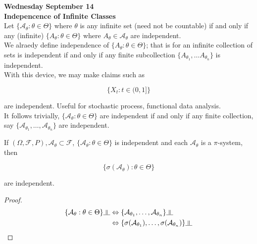\documentclass[11pt,fleqn]{book} %
\newcommand{\indep}{\rotatebox[origin=c]{90}{$\models$}}
\begin{document}
\textbf{Wednesday September 14}\\

\textbf{Indepencence of Infinite Classes}\\

Let $\{\mathcal{A}_\theta: \theta \in \Theta \}$ where $\theta$ is any infinite set (need not be countable) if and only if any (infinite) $\{A_\theta: \theta \in \Theta \}$ where $A_\theta \in \mathcal{A}_\theta$ are independent. \\

We alraedy define independence of $\{A_\theta: \theta \in \Theta \}$; that is for an infinite collection of sets is independent if and only if any finite subcollection $\{ A_{\theta_1}, \dots A_{\theta_n} \}$ is independent.\\

With this device, we may make claims such as

$$\{X_t: t \in (0,1] \} $$ 

are independent. Useful for stochastic process, functional data analysis.\\

It follows trivially, $\{\mathcal{A}_\theta: \theta \in \Theta \}$ are independent if and only if any finite collection, say $\{\mathcal{A}_{\theta_1}, \dots, \mathcal{A}_{\theta_n} \}$ are independent. 

\begin{corollary}[To Theorem 4.2]
	If $(\Omega, \mathcal{F}, P), \mathcal{A}_\theta \subset \mathcal{F}$,  $\{\mathcal{A}_\theta: \theta \in \Theta \}$ is independent and each $\mathcal{A}_\theta$ is a $\pi$-system, then

	$$\{ \sigma(\mathcal{A}_\theta): \theta \in \Theta \}$$

	are independent. 
\end{corollary}

\begin{proof}
	\begin{align*}
		\{\mathcal{A}_\theta: \theta \in \Theta \} \indep &\Leftrightarrow \{\mathcal{A}_{\theta_1}, \dots, \mathcal{A}_{\theta_n} \} \indep \\
		&\Leftrightarrow \{ \sigma(\mathcal{A}_{\theta_1}), \dots, \sigma(\mathcal{A}_{\theta_n}) \} \indep
	\end{align*}

\end{proof}
\end{document}
